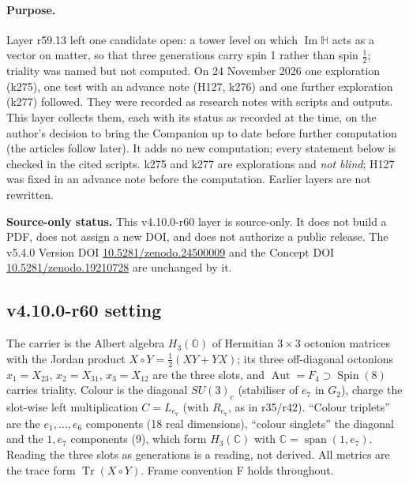 \paragraph{Purpose.}
Layer r59.13 left one candidate open: a tower level on which \(\operatorname{Im}\mathbb H\) acts as a vector on matter, so that three generations
carry spin 1 rather than spin \(\tfrac12\); triality was named but not computed.  On 24 November 2026 one exploration (k275), one test with an
advance note (H127, k276) and one further exploration (k277) followed.  They were recorded as research notes with scripts and outputs.  This
layer collects them, each with its status as recorded at the time, on the author's decision to bring the Companion up to date before further
computation (the articles follow later).  It adds no new computation; every statement below is checked in the cited scripts.  k275 and k277 are
explorations and \emph{not blind}; H127 was fixed in an advance note before the computation.  Earlier layers are not rewritten.

\noindent\textbf{Source-only status.}
This v4.10.0-r60 layer is source-only.  It does not build a PDF, does not assign a new DOI,
and does not authorize a public release.  The v5.4.0 Version DOI
\href{https://doi.org/10.5281/zenodo.24500009}{10.5281/zenodo.24500009} and the Concept DOI
\href{https://doi.org/10.5281/zenodo.19210728}{10.5281/zenodo.19210728} are unchanged by it.

\subsection*{v4.10.0-r60 setting}
\label{subsec:v4100-r60-setting}

The carrier is the Albert algebra \(H_3(\mathbb O)\) of Hermitian \(3\times3\) octonion matrices with the Jordan product \(X\circ Y=\tfrac12(XY+YX)\);
its three off-diagonal octonions \(x_1=X_{23}\), \(x_2=X_{31}\), \(x_3=X_{12}\) are the three slots, and \(\operatorname{Aut}=F_4\supset\operatorname{Spin}(8)\) carries
triality.  Colour is the diagonal \(SU(3)_c\) (stabiliser of \(e_7\) in \(G_2\)), charge the slot-wise left multiplication
\(C=L_{e_7}\) (with \(R_{e_7}\), as in r35/r42).  ``Colour triplets'' are the \(e_1,\dots,e_6\) components (18 real dimensions), ``colour singlets'' the
diagonal and the \(1,e_7\) components (9), which form \(H_3(\mathbb C)\) with \(\mathbb C=\operatorname{span}(1,e_7)\).  Reading the three slots as
generations is a reading, not derived.  All metrics are the trace form \(\operatorname{Tr}(X\circ Y)\).  Frame convention F holds throughout.

